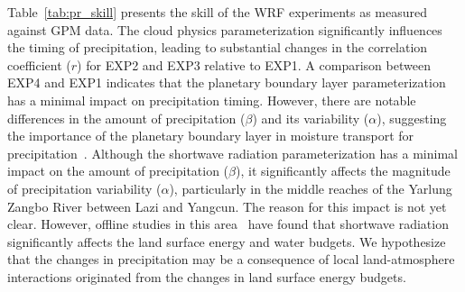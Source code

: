 \documentclass[draft]{agujournal2019}
\begin{document}
Table~\ref{tab:pr_skill} presents the skill of the WRF experiments as measured against GPM data. The cloud physics parameterization significantly influences the timing of precipitation, leading to substantial changes in the correlation coefficient ($r$) for EXP2 and EXP3 relative to EXP1. A comparison between EXP4 and EXP1 indicates that the planetary boundary layer parameterization has a minimal impact on precipitation timing. However, there are notable differences in the amount of precipitation ($\beta$) and its variability ($\alpha$), suggesting the importance of the planetary boundary layer in moisture transport for precipitation~\cite{wang2020GRL}. Although the shortwave radiation parameterization has a minimal impact on the amount of precipitation ($\beta$), it significantly affects the magnitude of precipitation variability ($\alpha$), particularly in the middle reaches of the Yarlung Zangbo River between Lazi and Yangcun. The reason for this impact is not yet clear. However, offline studies in this area~\cite{lei2024JH} have found that shortwave radiation significantly affects the land surface energy and water budgets. We hypothesize that the changes in precipitation may be a consequence of local land-atmosphere interactions originated from the changes in land surface energy budgets.
\end{document}
